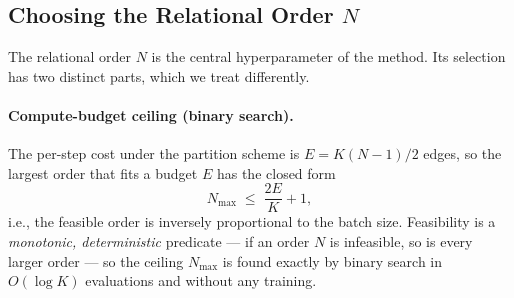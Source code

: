 \documentclass[11pt,letterpaper]{article}
\begin{document}
\subsection{Choosing the Relational Order \texorpdfstring{$N$}{N}}
\label{sec:order-n}

The relational order $N$ is the central hyperparameter of the method. Its selection
has two distinct parts, which we treat differently.

\paragraph{Compute-budget ceiling (binary search).} The per-step cost under the
partition scheme is $E = K(N-1)/2$ edges, so the largest order that fits a budget $E$
has the closed form
\begin{equation}
    N_{\max} \;\le\; \frac{2E}{K} + 1,
    \label{eq:order_ceiling}
\end{equation}
i.e., the feasible order is inversely proportional to the batch size. Feasibility is a
\emph{monotonic, deterministic} predicate --- if an order $N$ is infeasible, so is
every larger order --- so the ceiling $N_{\max}$ is found exactly by binary search in
$O(\log K)$ evaluations and without any training.
\end{document}
